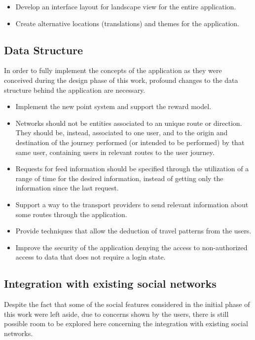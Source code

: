 \begin{itemize}
\item Develop an interface layout for landscape view for the entire application.

\item Create alternative locations (translations) and themes for the application. 

\end{itemize}

\subsection{Data Structure}

In order to fully implement the concepts of the application as they were conceived during the design phase of this work, profound changes to the data structure behind the application are necessary. 

\begin{itemize}
\item Implement the new point system and support the reward model.
\item Networks should not be entities associated to an unique route or direction. They should be, instead, associated to one user, and to the origin and destination of the journey performed (or intended to be performed) by that same user, containing users in relevant routes to the user journey.
\item Requests for feed information should be specified through the utilization of a range of time for the desired information, instead of getting only the information since the last request.
\item Support a way to the transport providers to send relevant information about some routes through the application.
\item Provide techniques that allow the deduction of travel patterns from the users.
\item Improve the security of the application denying the access to non-authorized access to data that does not require a login state. 
\end{itemize}

\subsection{Integration with existing social networks}

Despite the fact that some of the social features considered in the initial phase of this work were left aside, due to concerns shown by the users, there is still possible room to be explored here concerning the integration with existing social networks. 

